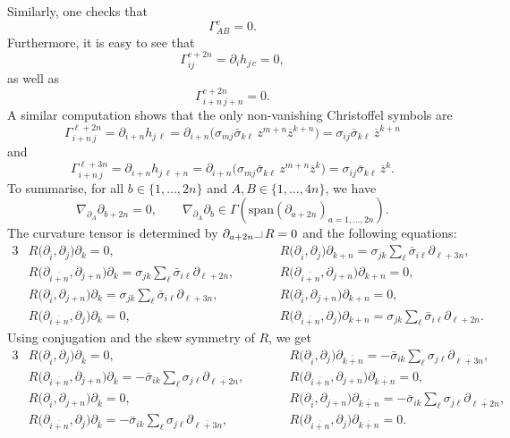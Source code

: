 \documentclass[11pt]{article}
\numberwithin{equation}{section}
\numberwithin{equation}{section}
\newcommand{\1}{\mathbf{1}}
\newcommand{\ol}{\overline}
\newcommand{\+}{\oplus}
\newcommand{\del}{\partial}
\renewcommand{\=}{\equiv}
\newcommand{\hook}{\makebox[7pt]{\rule{6pt}{.3pt}\rule{.3pt}{5pt}}\,}
\begin{document}
Similarly,
one
checks that
\[\Gamma^{c}_{AB} =0.\]
Furthermore, it is easy to see that
\[
\Gamma^{c+2n}_{i j}= \partial_{i}h_{j\, c}=0, \]
as well as
\[
\Gamma^{c+2n}_{i+n\,j+n}=0.
\]
A similar computation shows that the only non-vanishing Christoffel symbols are
\[
\Gamma^{\ell+2n}_{i+n\, j}
 =
 \partial_{i+n} h_{ j\, \ell}
 =
 \partial_{i+n} \bigl(
 \sigma_{mj}\bar{\sigma}_{k\ell}\,
 z^{m+n}\ol{z}^{k+n}\bigr)
 =
 \sigma_{ij}\bar{\sigma}_{k\ell}\,
\ol{z}^{k+n}
\]
and
 \[ \Gamma^{\ell+3n}_{i+n\, j}
 =
 \partial_{i+n} h_{ j\, \ell+n}
 =
 \partial_{i+n} \bigl(
 \sigma_{mj}\bar{\sigma}_{k\ell}\,
 z^{m+n}\ol{z}^{k} \bigr)
 =
 \sigma_{ij}\bar{\sigma}_{k\ell}\,
\ol{z}^{k} .\]
To summarise, for all $b\in \{1, \ldots, 2n\}$ and $A,B\in \{1, \ldots, 4n\}$, we have
\begin{equation}
\label{LC1}
\nabla_{\partial_A}\partial_{b+2n}=0,\qquad
\nabla_{\partial_A}\partial_b \in \Gamma (\mathrm{span} (\partial_{a+2n})_{a=1,\ldots, 2n}).\end{equation}
The curvature tensor is determined by ${\del_{a+2n}\hook R=0}$ and the following equations:
\begin{alignat*}{3}
&R\bigl(\del_{\overline{i}},\del_{j}\bigr)\del_{k} = 0,\qquad&& R\bigl(\del_{\overline{i}},\del_{j}\bigr)\del_{k+n} = \sigma_{jk}\sum_{\ell}\bar{\sigma}_{i\ell} \del_{\ell+3n},&
\\
&R\bigl(\del_{\overline{i+n}},\del_{j+n}\bigr)\del_{k} = \sigma_{jk}\sum_{\ell}\bar{\sigma}_{i\ell} \del_{\ell+2n},\qquad&& R\bigl(\del_{\overline{i+n}},\del_{j+n}\bigr)\del_{k+n} = 0,&
\\
&R\bigl(\del_{\overline{i}},\del_{j+n}\bigr)\del_{k} = \sigma_{jk}\sum_{\ell}\bar{\sigma}_{i\ell} \del_{\ell+3n},\qquad&& R\bigl(\del_{\overline{i}},\del_{j+n}\bigr)\del_{k+n} = 0,&
\\
&R\bigl(\del_{\overline{i+n}},\del_{j}\bigr)\del_{k} = 0,\qquad&& R\bigl(\del_{\overline{i+n}},\del_{j}\bigr)\del_{k+n} =
\sigma_{jk}\sum_{\ell}\bar{\sigma}_{i\ell} \del_{\ell+2n}.&
\end{alignat*}
Using conjugation and the skew symmetry of $R$, we get
\begin{alignat*}{3}
&R\bigl(\del_{\overline{i}},\del_{j}\bigr)\del_{\overline{k}} = 0,\qquad&& R\bigl(\del_{\overline{i}},\del_{j}\bigr)\del_{\overline{k+n}} = -\bar{\sigma}_{ik}\sum_{\ell}{\sigma}_{j\ell} \del_{\overline{\ell+3n}},&
\\
&R\bigl(\del_{\overline{i+n}},\del_{j+n}\bigr)\del_{\overline{k}} = -\bar{\sigma}_{ik}\sum_{\ell}{\sigma}_{j\ell} \del_{\overline{\ell+2n}}, \qquad&& R\bigl(\del_{\overline{i+n}},\del_{j+n}\bigr)\del_{\overline{k+n}} = 0,&
\\
&R\bigl(\del_{\overline{i}},\del_{j+n}\bigr)\del_{\overline{k}} = 0,\qquad&& R\bigl(\del_{\overline{i}},\del_{j+n}\bigr)\del_{\overline{k+n}} =
-\bar{\sigma}_{ik}\sum_{\ell}{\sigma}_{j\ell} \del_{\overline{\ell+2n}},&
\\
&R\bigl(\del_{\overline{i+n}},\del_{j}\bigr)\del_{\overline{k}} =
-\bar{\sigma}_{ik}\sum_{\ell}{\sigma}_{j\ell} \del_{\overline{\ell+3n}},\qquad&& R\bigl(\del_{\overline{i+n}},\del_{j}\bigr)\del_{\overline{k+n}} =0.&
\end{alignat*}
\end{document}
